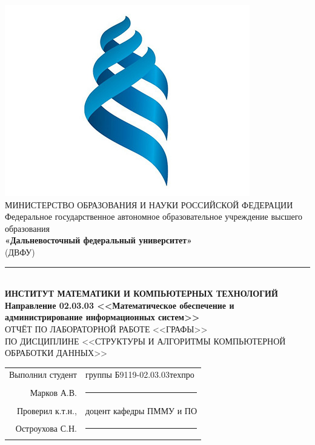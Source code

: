\documentclass[a4paper]{article}
\newcommand{\group}{Б9119-02.03.03техпро}
\newcommand{\teachertitle}{доцент кафедры ПММУ и ПО}
\begin{document}
	\thispagestyle{fancy}

	\begin{center}
		\includegraphics[scale=0.15]{graphics/fefu-logo} \\
		\MakeUppercase{Министерство образования и науки Российской Федерации} \\
		Федеральное государственное автономное образовательное учреждение высшего образования \\
		\textbf{«Дальневосточный федеральный университет»} \\ (ДВФУ) \\
		\noindent\rule{\textwidth}{1pt} \\ [0.5cm]
		\textbf{
			\MakeUppercase{Институт математики и компьютерных технологий} \\ [0.5cm]
            Направление 02.03.03 <<Математическое обеспечение и администрирование информационных систем>>
		} \\ [1cm]
		\MakeUppercase{
			Отчёт по лабораторной работе <<Графы>> \\ [0.5cm]
			по дисциплине <<Структуры и алгоритмы компьютерной обработки данных>> 
		} \\ [4cm]
	\end{center}

	\begin{flushright}
		\begin{tabular}{rl}
			Выполнил студент & группы \group                        \\ [0.1cm]
			Марков А.В.      & \rule{\widthof\teachertitle}{0.15mm} \\ [0.1cm]
			Проверил к.т.н., & \teachertitle                        \\ [0.1cm]
			Остроухова С.Н.  & \rule{\widthof\teachertitle}{0.15mm} \\
		\end{tabular}
	\end{flushright}
\end{document}
